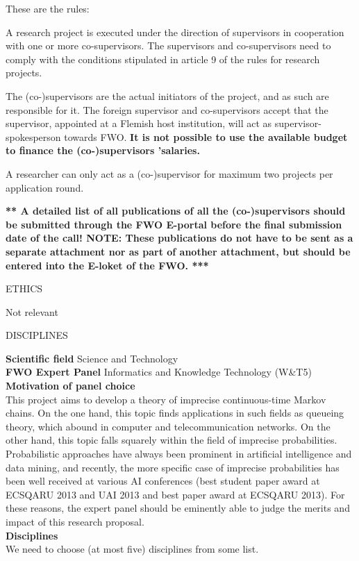 \documentclass[11pt,dvipsnames,usenames,a4paper]{article}
\begin{document}


{\color{Gray}
These are the rules:

A research project is executed under the direction of supervisors in cooperation with one or more co-supervisors. The supervisors and co-supervisors need to comply with the conditions stipulated in article 9 of the rules for research projects.

The (co-)supervisors are the actual initiators of the project, and as such are responsible for it. The foreign supervisor and co-supervisors accept that the supervisor, appointed at a Flemish host institution, will act as supervisor-spokesperson towards FWO. {\bf It is not possible to use the available budget to finance the (co-)supervisors ’salaries.}

A researcher can only act as a (co-)supervisor for maximum two projects per application round.
}

{\color{blue}\bf *** A detailed list of all publications of all the (co-)supervisors should be submitted through the FWO E-portal before the final submission date of the call!
NOTE: These publications do not have to be sent as a separate attachment nor as part of another attachment, but should be entered into the E-loket of the FWO. ***}

\vspace{5mm}

\begin{shaded}\centering ETHICS \end{shaded}

Not relevant

\vspace{5mm}

\begin{shaded}\centering DISCIPLINES \end{shaded}

{\bf Scientific field} \tab Science and Technology \\
{\bf FWO Expert Panel} \tab Informatics and Knowledge Technology (W\&T5) \\[8pt]
{\bf Motivation of panel choice}\\[6pt]
This project aims to develop a theory of imprecise continuous-time Markov chains. On the one hand, this topic finds applications in such fields as queueing theory, which abound in computer and telecommunication networks. On the other hand, this topic falls squarely within the field of imprecise probabilities. Probabilistic approaches have always been prominent in artificial intelligence and data mining, and recently, the more specific case of imprecise probabilities has been well received at various AI conferences (best student paper award at ECSQARU 2013 and UAI 2013 and best paper award at ECSQARU 2013). For these reasons, the expert panel should be eminently able to judge the merits and impact of this research proposal.\\[8pt]
{\bf Disciplines}\\[6pt]
We need to choose (at most five) disciplines from some list.
\end{document}
